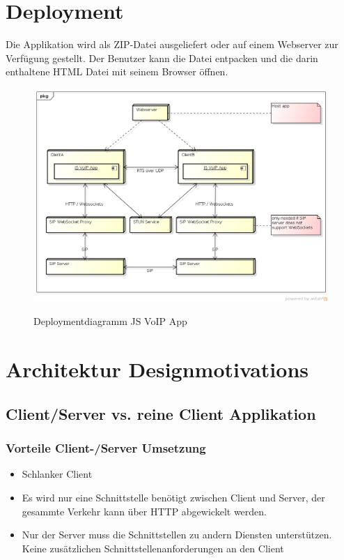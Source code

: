\section{Deployment}
	Die Applikation wird als ZIP-Datei ausgeliefert oder auf einem Webserver zur Verfügung gestellt. Der Benutzer kann die Datei entpacken und die darin enthaltene HTML Datei mit seinem Browser öffnen.
	\begin{figure}[h]
		\centering
		\includegraphics[width=1\textwidth]{img/deployment.png}
		\label{img:deployment}
		\caption{Deploymentdiagramm JS VoIP App}
	\end{figure}

\section{Architektur Designmotivations}
	\subsection{Client/Server vs. reine Client Applikation}
		\subsubsection{Vorteile Client-/Server Umsetzung}
		\begin{itemize}
			\item Schlanker Client
			\item Es wird nur eine Schnittstelle benötigt zwischen Client und Server, der gesammte Verkehr kann über HTTP abgewickelt werden.
			\item Nur der Server muss die Schnittstellen zu andern Diensten unterstützen. Keine zusätzlichen Schnittstellenanforderungen an den Client
		\end{itemize}
